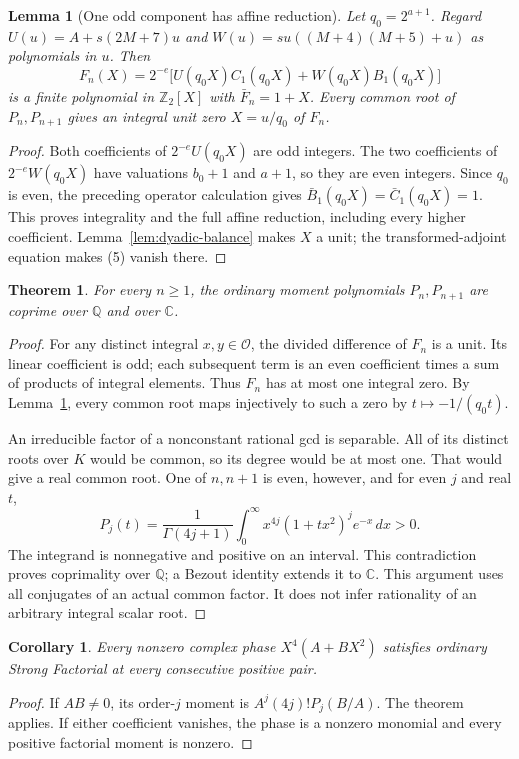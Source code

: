 \documentclass[11pt]{article}
\newtheorem{lemma}{Lemma}
\newtheorem{theorem}{Theorem}
\newtheorem{corollary}{Corollary}
\newcommand{\Q}{\mathbb Q}
\begin{document}
\begin{lemma}[One odd component has affine reduction]
\label{lem:odd-scalar-minor}
Let $q_0=2^{a+1}$. Regard $U(u)=A+s(2M+7)u$ and
$W(u)=su((M+4)(M+5)+u)$ as polynomials in $u$. Then
\[
 F_n(X)=2^{-e}\bigl[
 U(q_0X)C_1(q_0X)+W(q_0X)B_1(q_0X)\bigr]
                                                        \tag{5}
\]
is a finite polynomial in $\mathbb Z_2[X]$ with
$\bar F_n=1+X$.
Every common root of $P_n,P_{n+1}$ gives an integral unit zero
$X=u/q_0$ of $F_n$.
\end{lemma}
\begin{proof}
Both coefficients of $2^{-e}U(q_0X)$ are odd integers.
The two coefficients of $2^{-e}W(q_0X)$ have valuations
$b_0+1$ and $a+1$, so they are even integers.
Since $q_0$ is even, the preceding operator calculation gives
$\bar B_1(q_0X)=\bar C_1(q_0X)=1$.
This proves integrality and the full affine reduction, including
every higher coefficient. Lemma~\ref{lem:dyadic-balance} makes
$X$ a unit; the transformed-adjoint equation makes (5) vanish there.
\end{proof}

\begin{theorem}\label{thm:ordinary-lower-four-gap-two}
For every $n\ge1$, the ordinary moment polynomials
$P_n,P_{n+1}$ are coprime over $\Q$ and over $\mathbb C$.
\end{theorem}
\begin{proof}
For any distinct integral $x,y\in\mathcal O$, the divided
difference of $F_n$ is a unit. Its linear coefficient is odd;
each subsequent term is an even coefficient times a sum of products
of integral elements. Thus $F_n$ has at most one integral zero.
By Lemma~\ref{lem:odd-scalar-minor}, every common root maps
injectively to such a zero by $t\mapsto-1/(q_0t)$.

An irreducible factor of a nonconstant rational gcd is separable.
All of its distinct roots over $K$ would be common, so its degree
would be at most one. That would give a real common root.
One of $n,n+1$ is even, however, and for even $j$ and real $t$,
\[
 P_j(t)=\frac1{\Gamma(4j+1)}
        \int_0^\infty x^{4j}(1+tx^2)^j e^{-x}\,dx>0.
\]
The integrand is nonnegative and positive on an interval.
This contradiction proves coprimality over $\Q$; a Bezout identity
extends it to $\mathbb C$.
This argument uses all conjugates of an actual common factor.
It does not infer rationality of an arbitrary integral scalar root.
\end{proof}

\begin{corollary}\label{cor:ordinary-support-four-six}
Every nonzero complex phase $X^4(A+BX^2)$ satisfies ordinary
Strong Factorial at every consecutive positive pair.
\end{corollary}
\begin{proof}
If $AB\ne0$, its order-$j$ moment is $A^j(4j)!P_j(B/A)$.
The theorem applies. If either coefficient vanishes, the phase is
a nonzero monomial and every positive factorial moment is nonzero.
\end{proof}
\end{document}
